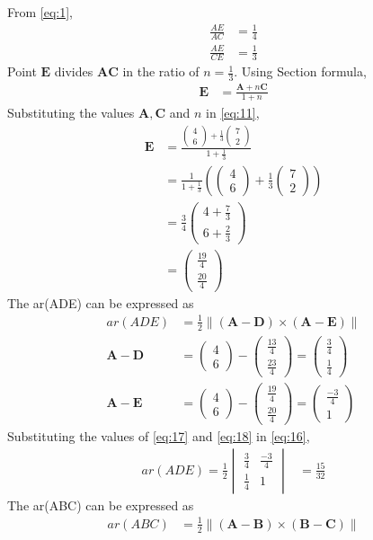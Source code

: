 \documentclass[12pt]{article}
\newcommand{\mydet}[1]{\ensuremath{\begin{vmatrix}#1\end{vmatrix}}}
\providecommand{\brak}[1]{\ensuremath{\left(#1\right)}}
\providecommand{\norm}[1]{\left\lVert#1\right\rVert}
\newcommand{\myvec}[1]{\ensuremath{\begin{pmatrix}#1\end{pmatrix}}}
\let\vec\mathbf
\begin{document}
\begin{enumerate}
From \eqref{eq:1},
\begin{align}
\frac{AE}{AC} &=\frac{1}{4}\\
\frac{AE}{CE} &=\frac{1}{3}
\end{align}
Point $\vec{E}$ divides $\vec{A}\vec{C}$ in the ratio of $n = \frac{1}{3}$.
Using Section formula,
\begin{align}
\vec{E} &=\frac{\vec{A}+n\vec{C}}{1+n}\label{eq:11}
\end{align}
Substituting the values $\vec{A},\vec{C}$ and $n$ in \eqref{eq:11},
\begin{align}
\vec{E} &=\frac{{\myvec{4\\6}+\frac{1}{3}\myvec{7\\2}}}{1+\frac{1}{3}}\\
	&=\frac{1}{1+\frac{1}{3}}\brak{{\myvec{4\\6}+\frac{1}{3}\myvec{7\\2}}} \\
	&=\frac{3}{4}\myvec{4+\frac{7}{3}\\[2pt]6+\frac{2}{3}}\\
	&=\myvec{\frac{19}{4}\\[2pt] \frac{20}{4}}
\end{align}
The ar(ADE) can be expressed as
\begin{align}
	ar(ADE) &=\frac{1}{2} \norm{\brak{\vec{A}-\vec{D}}  \times 
   \brak{\vec{A}- \vec{E}}} \label{eq:16} \\
	\vec{A}- \vec{D} &= \myvec{4\\6}-\myvec{\frac{13}{4}\\[2pt] \frac{23}{4}}=\myvec{\frac{3}{4}\\[2pt] \frac{1}{4}}\label{eq:17}\\
	  \vec{A}- \vec{E} &= \myvec{4\\6}-\myvec{\frac{19}{4}\\[2pt] \frac{20}{4}}=\myvec{\frac{-3}{4}\\[2pt]1}\label{eq:18}
  \end{align}
Substituting the values of \eqref{eq:17} and \eqref{eq:18} in \eqref{eq:16},
\begin{align}
	ar(ADE)=\frac{1}{2}\mydet{\frac{3}{4} & \frac{-3}{4}\\[2pt] \frac{1}{4} & 1}  
	&=	\frac{15}{32}
\end{align}
The ar(ABC) can be expressed as
  \begin{align}
	  ar(ABC) &=\frac{1}{2} \norm{\brak{\vec{A}-\vec{B}}  \times 
   \brak{\vec{B}- \vec{C}}} \label{eq:20} \\

\end{align}
\end{enumerate}
\end{document}
